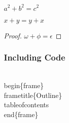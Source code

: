 \documentclass{beamer}
\begin{document}
      \begin{frame}
        \begin{theorem}[Pythagoras]
          $ a^2 + b^2 = c^2$
        \end{theorem}
        \begin{corollary}
          $ x + y = y + x  $
        \end{corollary}
        \begin{proof}
          $\omega +\phi = \epsilon $
        \end{proof}
      \end{frame}

      \begin{frame}[fragile]
        \frametitle{Including Code}
        \begin{semiverbatim}
          \\begin\{frame\}
          \\frametitle\{Outline\}
          \\tableofcontents
          \\end\{frame\}
        \end{semiverbatim}
      \end{frame}
\end{document}
